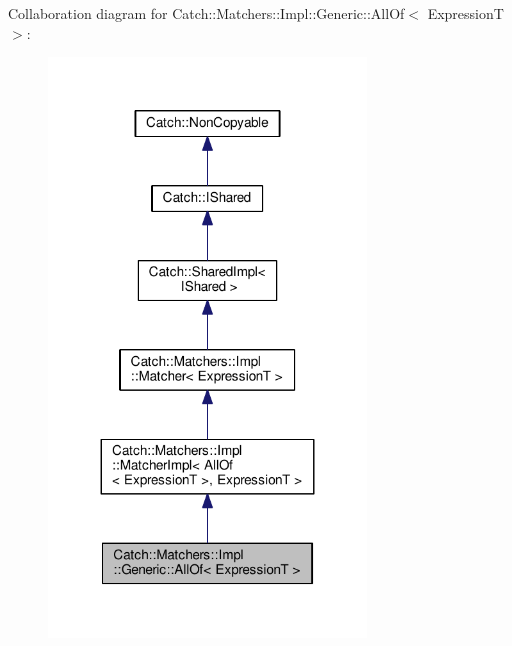 Collaboration diagram for Catch\+:\+:Matchers\+:\+:Impl\+:\+:Generic\+:\+:All\+Of$<$ ExpressionT $>$\+:
\nopagebreak
\begin{figure}[H]
\begin{center}
\leavevmode
\includegraphics[width=239pt]{classCatch_1_1Matchers_1_1Impl_1_1Generic_1_1AllOf__coll__graph}
\end{center}
\end{figure}
